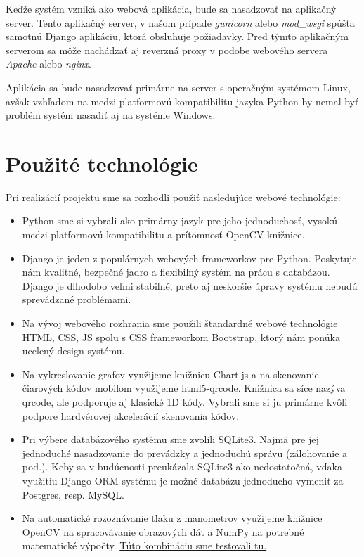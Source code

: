 \documentclass{zah}
\begin{document}
Keďže systém vzniká ako webová aplikácia, bude sa nasadzovať na aplikačný server.
Tento aplikačný server, v našom prípade \textit{gunicorn} alebo \textit{mod\_wsgi} spúšťa samotnú
Django aplikáciu, ktorá obsluhuje požiadavky. Pred týmto aplikačným serverom sa môže nachádzať aj
reverzná proxy v podobe webového servera \textit{Apache} alebo \textit{nginx}.

Aplikácia sa bude nasadzovať primárne na server s operačným systémom Linux, avšak vzhľadom na
medzi-platformovú kompatibilitu jazyka Python by nemal byť problém systém nasadiť aj na systéme Windows.

\section{Použité technológie}

Pri realizácií projektu sme sa rozhodli použiť nasledujúce webové technológie:

\begin{itemize}
\item Python sme si vybrali ako primárny jazyk pre jeho jednoduchosť,
	vysokú medzi-platformovú kompatibilitu a prítomnosť OpenCV knižnice.
\item Django je jeden z populárnych webových frameworkov pre Python. 
	Poskytuje nám kvalitné, bezpečné jadro a flexibilný 
	systém na prácu s databázou. Django je dlhodobo veľmi stabilné,
	preto aj neskoršie úpravy systému nebudú sprevádzané problémami.
\item Na vývoj webového rozhrania sme použili štandardné webové technológie
	HTML, CSS, JS spolu s CSS frameworkom Bootstrap, ktorý nám ponúka ucelený
	design systému.
\item Na vykreslovanie grafov využijeme knižnicu Chart.js a na skenovanie čiarových
	kódov mobilom využijeme html5-qrcode. Knižnica sa síce nazýva qrcode, ale podporuje
	aj klasické 1D kódy. Vybrali sme si ju primárne kvôli podpore hardvérovej akcelerácií
	skenovania kódov.
\item Pri výbere databázového systému sme zvolili SQLite3. Najmä pre jej jednoduché
	nasadzovanie do prevádzky a jednoduchú správu (zálohovanie a pod.). Keby sa v budúcnosti
	preukázala SQLite3 ako nedostatočná, vďaka využitiu Django ORM systému je možné databázu
	jednoducho vymeniť za Postgres, resp. MySQL.
\item Na automatické rozoznávanie tlaku z manometrov využijeme knižnice OpenCV na 
	spracovávanie obrazových dát a NumPy na potrebné matematické výpočty.
	\href{https://github.com/TIS2023-FMFI/evidencia-flias/tree/Manometre-demo/Demo}{Túto kombináciu sme testovali tu.}
\end{itemize}
\end{document}
